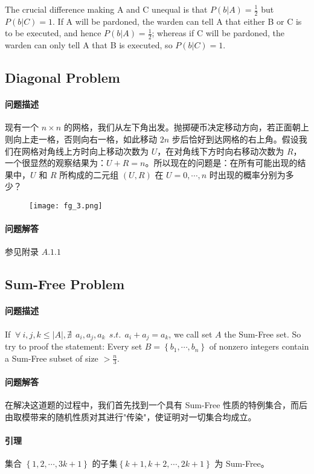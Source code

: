 		The crucial difference making A and C unequal is that
		$ P(b|A) = \frac{1}{2} $ but $ P(b|C) = 1 $. If A will be pardoned, the warden can tell A that either B or C is to be executed, and hence $ P(b|A) = \frac{1}{2} $; whereas if C will be pardoned, the warden can only tell A that B is executed, so $ P(b|C) = 1 $.


	\subsection{Diagonal Problem}
		\paragraph{问题描述}
	 	现有一个 $n \times n$ 的网格，我们从左下角出发。抛掷硬币决定移动方向，若正面朝上则向上走一格，否则向右一格，如此移动 $2n$ 步后恰好到达网格的右上角。假设我们在网格对角线上方时向上移动次数为 $U$，在对角线下方时向右移动次数为 $R$，一个很显然的观察结果为：$U + R = n$。所以现在的问题是：在所有可能出现的结果中，$U$ 和 $R$ 所构成的二元组 $(U, R)$ 在 $U = 0, \cdots ,n$ 时出现的概率分别为多少？
		\begin{figure}[htbp]
		\centering
		\texttt{[image: fg\_3.png]}
		\end{figure}
		\paragraph{问题解答}
			参见附录 $A.1.1$

	\subsection{Sum-Free Problem}
		\paragraph{问题描述}
	 	If $\ \forall \  i,j,k \le |A|, \nexists \  \ a_i,a_j,a_k \ \  s.t. \  \  a_i + a_j = a_k $, we call set $A$ the Sum-Free set. So try to proof the statement: Every set $B = \left\{ b_1, \cdots , b_n \right\} $ of nonzero integers contain a Sum-Free subset of size $> \frac{n}{3}$.
		\paragraph{问题解答}
		 在解决这道题的过程中，我们首先找到一个具有 Sum-Free 性质的特例集合，而后由取模带来的随机性质对其进行"传染"，使证明对一切集合均成立。
		 \paragraph{引理}
		 集合 $\left\{ 1,2, \cdots ,3k+1 \right\}$ 的子集$  \left\{ k+1, k+2, \cdots , 2k+1 \right\} $ 为 Sum-Free。
